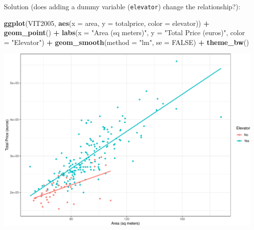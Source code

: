 \documentclass[
  ignorenonframetext,
]{beamer}
\newenvironment{Shaded}{\begin{snugshade}}{\end{snugshade}}
\newcommand{\AttributeTok}[1]{\textcolor[rgb]{0.13,0.29,0.53}{#1}}
\newcommand{\ConstantTok}[1]{\textcolor[rgb]{0.56,0.35,0.01}{#1}}
\newcommand{\FunctionTok}[1]{\textcolor[rgb]{0.13,0.29,0.53}{\textbf{#1}}}
\newcommand{\NormalTok}[1]{#1}
\newcommand{\SpecialCharTok}[1]{\textcolor[rgb]{0.81,0.36,0.00}{\textbf{#1}}}
\newcommand{\StringTok}[1]{\textcolor[rgb]{0.31,0.60,0.02}{#1}}
\begin{document}
\begin{frame}[fragile]{Solution (does adding a dummy variable
(\texttt{elevator}) change the relationship?):}
\protect\hypertarget{solution-does-adding-a-dummy-variable-elevator-change-the-relationship}{}
\scriptsize

\begin{Shaded}
\begin{Highlighting}[]
\FunctionTok{ggplot}\NormalTok{(VIT2005, }\FunctionTok{aes}\NormalTok{(}\AttributeTok{x =}\NormalTok{ area, }\AttributeTok{y =}\NormalTok{ totalprice, }\AttributeTok{color =}\NormalTok{ elevator)) }\SpecialCharTok{+}
  \FunctionTok{geom\_point}\NormalTok{() }\SpecialCharTok{+}
  \FunctionTok{labs}\NormalTok{(}\AttributeTok{x =} \StringTok{"Area (sq meters)"}\NormalTok{, }\AttributeTok{y =} \StringTok{"Total Price (euros)"}\NormalTok{, }
       \AttributeTok{color =} \StringTok{"Elevator"}\NormalTok{) }\SpecialCharTok{+}
  \FunctionTok{geom\_smooth}\NormalTok{(}\AttributeTok{method =} \StringTok{"lm"}\NormalTok{, }\AttributeTok{se =} \ConstantTok{FALSE}\NormalTok{) }\SpecialCharTok{+} 
  \FunctionTok{theme\_bw}\NormalTok{()}
\end{Highlighting}
\end{Shaded}

\begin{center}\includegraphics[width=0.8\linewidth,height=0.5\textheight]{Week5_Lect_files/figure-beamer/unnamed-chunk-32-1} \end{center}
\normalsize
\end{frame}
\end{document}
